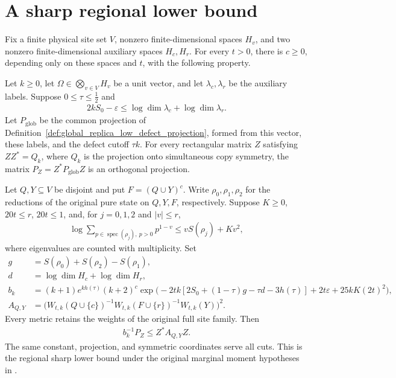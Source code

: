 \section{A sharp regional lower bound}

\begin{theorem}
  \label{thm:global_regional_low_defect_sharp_lower_bound}
  \leanok
  Fix a finite physical site set $V$, nonzero finite-dimensional spaces
  $H_v$, and two nonzero finite-dimensional auxiliary spaces $H_c,H_r$.
  For every $t>0$, there is $c\geq0$, depending only on these spaces and
  $t$, with the following property.

  Let $k\geq0$, let $\Omega\in\bigotimes_{v\in V}H_v$ be a unit vector,
  and let $\lambda_c,\lambda_r$ be the auxiliary labels. Suppose
  $0\leq\tau\leq\tfrac12$ and
  \begin{align*}
    2kS_0-\varepsilon
      \leq\log\dim\lambda_c+\log\dim\lambda_r.
  \end{align*}
  Let $P_{\mathrm{glob}}$ be the common projection of
  Definition~\ref{def:global_replica_low_defect_projection}, formed from
  this vector, these labels, and the defect cutoff $\tau k$.
  For every rectangular matrix $Z$ satisfying $ZZ^*=Q_k$, where $Q_k$
  is the projection onto simultaneous copy symmetry, the matrix
  $P_Z=Z^*P_{\mathrm{glob}}Z$ is an orthogonal projection.

  Let $Q,Y\subseteq V$ be disjoint and put $F=(Q\cup Y)^c$.
  Write $\rho_0,\rho_1,\rho_2$ for the reductions of the original pure
  state on $Q,Y,F$, respectively. Suppose $K\geq0$, $20t\leq r$,
  $20t\leq1$, and, for $j=0,1,2$ and $|v|\leq r$,
  \begin{align*}
    \log\sum_{p\in\operatorname{spec}(\rho_j),\ p>0}p^{1-v}
      \leq vS(\rho_j)+Kv^2,
  \end{align*}
  where eigenvalues are counted with multiplicity. Set
  \begin{align*}
    g&=S(\rho_0)+S(\rho_2)-S(\rho_1),\\
    d&=\log\dim H_c+\log\dim H_r,\\
    b_k&=(k+1)e^{kh(\tau)}(k+2)^c
      \exp\bigl(-2tk[2S_0+(1-\tau)g-\tau d-3h(\tau)]
        +2t\varepsilon+25kK(2t)^2\bigr),\\
    A_{Q,Y}&=\bigl(W_{t,k}(Q\cup\{c\})^{-1}
      W_{t,k}(F\cup\{r\})^{-1}W_{t,k}(Y)\bigr)^2.
  \end{align*}
  Every metric retains the weights of the original full site family.
  Then
  \begin{align*}
    b_k^{-1}P_Z\leq Z^*A_{Q,Y}Z.
  \end{align*}
  The same constant, projection, and symmetric coordinates serve all cuts.
  This is the regional sharp lower bound under the original marginal
  moment hypotheses in \cite[Section~8]{OpenAI2026AreaLaw}.
\end{theorem}
